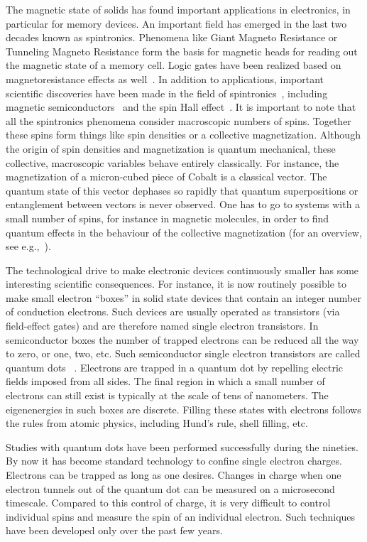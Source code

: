 \documentclass[rmp,twocolumn,aps]{revtex4}
\begin{document}
The magnetic state of solids has found important applications in
electronics, in particular for memory devices. An important field
has emerged in the last two decades known as spintronics.
Phenomena like Giant Magneto Resistance or Tunneling Magneto
Resistance form the basis for magnetic heads for reading out the
magnetic state of a memory cell. Logic gates have been realized
based on magnetoresistance effects as well~\cite{wolf01,zutic04}.
In addition to applications, important scientific discoveries have been
made in the field of spintronics~\cite{awsch07}, including magnetic semiconductors~\cite{ohno98} and the spin Hall
effect~\cite{awschalom05}. It is important to note that all the
spintronics phenomena consider macroscopic numbers of spins.
Together these spins form things like spin densities or a
collective magnetization. Although the origin of spin densities
and magnetization is quantum mechanical, these collective,
macroscopic variables behave entirely classically. For instance, the
magnetization of a micron-cubed piece of Cobalt is a classical
vector. The quantum state of this vector dephases so rapidly that
quantum superpositions or entanglement between vectors is never
observed. One has to go to systems with a small number of spins,
for instance in magnetic molecules, in order to find quantum
effects in the behaviour of the collective
magnetization (for an overview, see e.g.,~\textcite{gunther91}).

The technological drive to make electronic devices continuously
smaller has some interesting scientific consequences. For
instance, it is now routinely possible to make small electron
``boxes'' in solid state devices that contain an integer number of
conduction electrons. Such devices are usually operated as
transistors (via field-effect gates) and are therefore named
single electron transistors. In semiconductor boxes the number of
trapped electrons can be reduced all the way to zero, or one, two,
etc. Such semiconductor single electron transistors are called
quantum dots ~\cite{kouwenhoven01}. Electrons are trapped in a quantum
dot by repelling electric fields imposed from all sides. The final
region in which a small number of electrons can still exist is
typically at the scale of tens of nanometers. The eigenenergies in
such boxes are discrete. Filling these states with electrons
follows the rules from atomic physics, including Hund's rule,
shell filling, etc. 

Studies with quantum dots have been performed successfully
during the nineties. By now it has become standard technology to confine single electron charges. Electrons
can be trapped as long as one desires. Changes in charge when one
electron tunnels out of the quantum dot can be measured on a
microsecond timescale. Compared to this control of charge, it is
very difficult to control individual spins and measure the spin of
an individual electron. Such techniques have been developed only
over the past few years.
\end{document}
